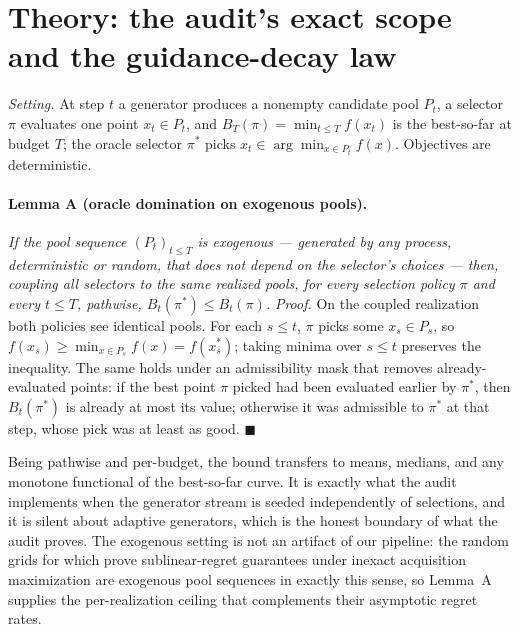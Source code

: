 \documentclass[%
 aip,
 amsmath,amssymb,
 floatfix,
 reprint,%
]{revtex4-1}
\begin{document}
\begin{acknowledgments}
\end{acknowledgments}

\appendix

\section{Theory: the audit's exact scope and the guidance-decay law}
\label{app:theory}

\emph{Setting.} At step $t$ a generator produces a nonempty candidate
pool $P_t$, a selector $\pi$ evaluates one point $x_t \in P_t$, and
$B_T(\pi) = \min_{t \le T} f(x_t)$ is the best-so-far at budget $T$; the
oracle selector $\pi^\ast$ picks $x_t \in \arg\min_{x \in P_t} f(x)$.
Objectives are deterministic.

\paragraph{Lemma A (oracle domination on exogenous pools).}
\emph{If the pool sequence $(P_t)_{t\le T}$ is exogenous --- generated
by any process, deterministic or random, that does not depend on the
selector's choices --- then, coupling all selectors to the same realized
pools, for every selection policy $\pi$ and every $t \le T$, pathwise,
$B_t(\pi^\ast) \le B_t(\pi)$.}
\emph{Proof.} On the coupled realization both policies see identical
pools. For each $s \le t$, $\pi$ picks some $x_s \in P_s$, so
$f(x_s) \ge \min_{x \in P_s} f(x) = f(x^\ast_s)$; taking minima over
$s \le t$ preserves the inequality. The same holds under an
admissibility mask that removes already-evaluated points: if the best
point $\pi$ picked had been evaluated earlier by $\pi^\ast$, then
$B_t(\pi^\ast)$ is already at most its value; otherwise it was admissible
to $\pi^\ast$ at that step, whose pick was at least as good. $\blacksquare$

Being pathwise and per-budget, the bound transfers to means, medians,
and any monotone functional of the best-so-far curve. It is exactly what
the audit implements when the generator stream is seeded independently
of selections, and it is silent about adaptive generators, which is
the honest boundary of what the audit proves. The exogenous setting is
not an artifact of our pipeline: the random grids for which
\citet{kim2025inexact} prove sublinear-regret guarantees under inexact
acquisition maximization are exogenous pool sequences in exactly this
sense, so Lemma~A supplies the per-realization ceiling that complements
their asymptotic regret rates.
\end{document}
